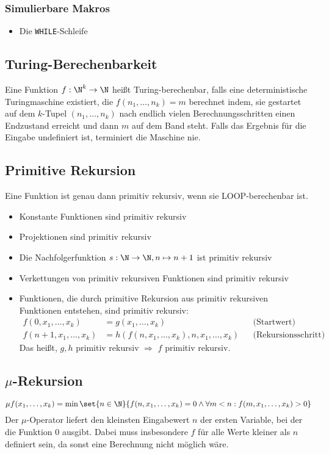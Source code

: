 \subsubsection{Simulierbare Makros}
\begin{itemize}
	\item Die \texttt{WHILE}-Schleife
\end{itemize}

\subsection{Turing-Berechenbarkeit}\label{sec:turing}
Eine Funktion $f:\N^k\rightarrow \N$ heißt Turing-berechenbar, falls eine deterministische Turingmaschine existiert, die $f(n_1,\ldots,n_k)=m$ berechnet indem, sie gestartet auf dem $k$-Tupel $(n_1,\ldots,n_k)$ nach endlich vielen Berechnungsschritten einen Endzustand erreicht und dann $m$ auf dem Band steht. Falls das Ergebnis für die Eingabe undefiniert ist, terminiert die Maschine nie.

\subsection{Primitive Rekursion}\label{sec:primrec}
Eine Funktion ist genau dann primitiv rekursiv, wenn sie LOOP-berechenbar ist.
\begin{itemize}
	\item Konstante Funktionen sind primitiv rekursiv
	\item Projektionen sind primitiv rekursiv
	\item Die Nachfolgerfunktion $s:\N\rightarrow\N, n\mapsto n+1$ ist primitiv rekursiv
	\item Verkettungen von primitiv rekursiven Funktionen sind primitiv rekursiv
	\item Funktionen, die durch primitive Rekursion aus primitiv rekursiven Funktionen entstehen, sind primitiv rekursiv:
	\begin{align*}
		f(0,x_1,\ldots,x_k)&=g(x_1,\ldots,x_k) &&\text{(Startwert)}\\
		f(n+1,x_1,\ldots,x_k)&=h(f(n,x_1,\ldots,x_k),n,x_1,\ldots,x_k) &&\text{(Rekursionsschritt)}
	\end{align*}
	Das heißt, $g, h$ primitiv rekursiv $\Rightarrow$ $f$ primitiv rekursiv.
\end{itemize}

\subsection{$\mu$-Rekursion}\label{sec:murec}
\begin{equation*}
	\mu f(x_1,\ldots,x_k)=\min \set{n\in\N}{f(n,x_1,\ldots,x_k)=0 \wedge \forall m<n:f(m,x_1,\ldots,x_k)>0}
\end{equation*}
Der $\mu$-Operator liefert den kleinsten Eingabewert $n$ der ersten Variable, bei der die Funktion $0$ ausgibt. Dabei muss insbesondere $f$ für alle Werte kleiner als $n$ definiert sein, da sonst eine Berechnung nicht möglich wäre.

